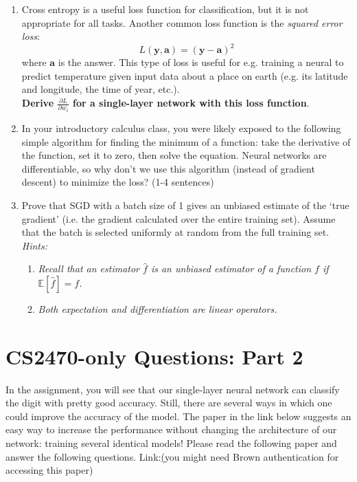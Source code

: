 \documentclass{article}
\begin{document}
\begin{enumerate}

    \item Cross entropy is a useful loss function for classification, but it is not appropriate for all tasks. Another common loss function is the \emph{squared error loss}:
    \begin{equation*}
        L(\mathbf{y}, \mathbf{a}) = (\mathbf{y} - \mathbf{a})^2
    \end{equation*}
   where $\mathbf{a}$ is the answer. This type of loss is useful for e.g. training a neural to predict temperature given input data about a place on earth (e.g. its latitude and longitude, the time of year, etc.).\\
    \textbf{Derive $\frac{\partial L}{\partial w_{i}}$ for a single-layer network with this loss function}.

    \item In your introductory calculus class, you were likely exposed to the following simple algorithm for finding the minimum of a function: take the derivative of the function, set it to zero, then solve the equation. Neural networks are differentiable, so why don't we use this algorithm (instead of gradient descent) to minimize the loss? (1-4 sentences)
    
    \item Prove that SGD with a batch size of 1 gives an unbiased estimate of the `true gradient' (i.e. the gradient calculated over the entire training set). Assume that the batch is selected uniformly at random from the full training set.\\
    \textit{Hints:}
    \begin{enumerate}
        \item \textit{Recall that an estimator $\hat{f}$ is an unbiased estimator of a function $f$ if $\mathbb{E}[\hat{f}] = f$.}
        \item \textit{Both expectation and differentiation are linear operators.}
        
    \end{enumerate}
    
\end{enumerate}

\section{CS2470-only Questions: Part 2}

    In the assignment, you will see that our single-layer neural network can classify the digit with pretty good accuracy. Still, there are several ways in which one could improve the accuracy of the model. The paper in the link below suggests an easy way to increase the performance without changing the architecture of our network: training several identical models! Please read the following paper and answer the following questions.
    \newline \newline
    Link:\href{https://ieeexplore.ieee.org/stamp/stamp.jsp?tp=&arnumber=6065510} 
    (you might need Brown authentication for accessing this paper)
\end{document}
